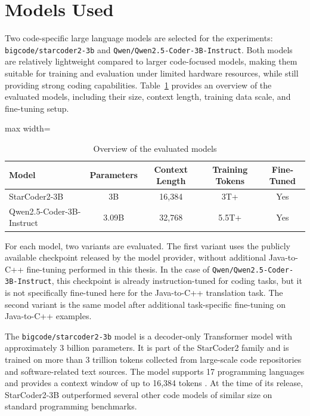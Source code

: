 \section{Models Used}

Two code-specific large language models are selected for the experiments:
\texttt{bigcode/starcoder2-3b} and
\texttt{Qwen/Qwen2.5-Coder-3B-Instruct}. Both models are relatively lightweight
compared to larger code-focused models, making them suitable for training and
evaluation under limited hardware resources, while still providing strong coding
capabilities. Table~\ref{tab:model_overview} provides an overview of the evaluated models,
including their size, context length, training data scale, and fine-tuning setup.

\begin{table}[b]
\centering
\caption{Overview of the evaluated models}
\begin{adjustbox}{max width=\textwidth}
\begin{tabular}{lcccc}
\hline
Model & Parameters & Context Length & Training Tokens & Fine-Tuned \\
\hline
StarCoder2-3B & 3B & 16,384 & 3T+ & Yes \\
Qwen2.5-Coder-3B-Instruct & 3.09B & 32,768 & 5.5T+ & Yes \\
\hline
\end{tabular}
\end{adjustbox}
\label{tab:model_overview}
\end{table}

For each model, two variants are evaluated. The first variant uses the publicly
available checkpoint released by the model provider, without additional
Java-to-C++ fine-tuning performed in this thesis. In the case of
\texttt{Qwen/Qwen2.5-Coder-3B-Instruct}, this checkpoint is already
instruction-tuned for coding tasks, but it is not specifically fine-tuned here
for the Java-to-C++ translation task. The second variant is the same model after
additional task-specific fine-tuning on Java-to-C++ examples.

The \texttt{bigcode/starcoder2-3b} model is a decoder-only Transformer model
with approximately 3 billion parameters. It is part of the StarCoder2 family
and is trained on more than 3 trillion tokens collected from large-scale code
repositories and software-related text sources. The model supports 17
programming languages and provides a context window of up to 16,384 tokens
\cite{starcoder2, starcoder2_hf}. At the time of its release, StarCoder2-3B
outperformed several other code models of similar size on standard programming benchmarks.


